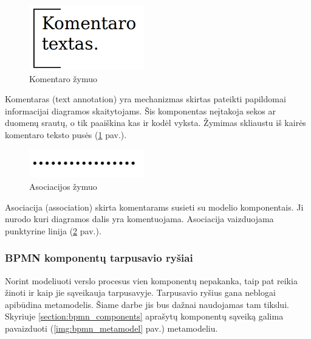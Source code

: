 \begin{figure}[H]
	\centering
	\includegraphics[width=5cm]{img/bpm-components/text_annotation}
	\caption{Komentaro žymuo}
	\label{img:bpm_components_text_annotation}
\end{figure}

Komentaras (text annotation) yra mechanizmas skirtas pateikti papildomai informacijai diagramos skaitytojams. Šis komponentas neįtakoja sekos ar duomenų srautų, o tik paaiškina kas ir kodėl vyksta. Žymimas skliaustu iš kairės komentaro teksto pusės (\ref{img:bpm_components_text_annotation} pav.).

\begin{figure}[H]
	\centering
	\includegraphics[width=5cm]{img/bpm-components/association}
	\caption{Asociacijos žymuo}
	\label{img:bpm_components_text_association}
\end{figure}

Asociacija (association) skirta komentarams susieti su modelio komponentais. Ji nurodo kuri diagramos dalis yra komentuojama. Asociacija vaizduojama punktyrine linija (\ref{img:bpm_components_text_association} pav.).

\subsubsection{BPMN komponentų tarpusavio ryšiai}
Norint modeliuoti verslo procesus vien komponentų nepakanka, taip pat reikia žinoti ir kaip jie sąveikauja tarpusavyje. Tarpusavio ryšius gana neblogai apibūdina metamodelis. Šiame darbe jis bus dažnai naudojamas tam tikslui. Skyriuje \ref{section:bpmn_components} aprašytų komponentų sąveiką galima pavaizduoti (\ref{img:bpmn_metamodel} pav.) metamodeliu.

